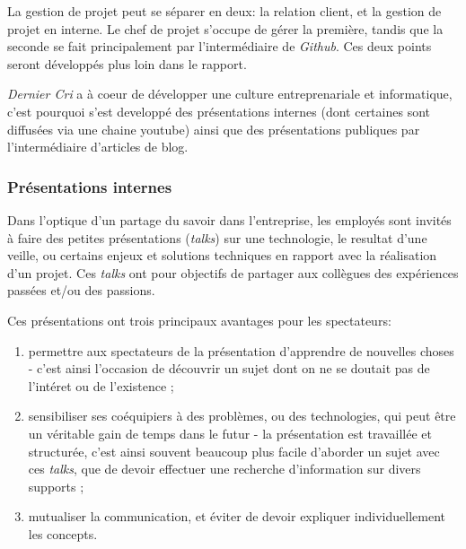 \bigskip

La gestion de projet peut se séparer en deux: la relation client, et la
gestion de projet en interne. Le chef de projet s'occupe de gérer la
première, tandis que la seconde se fait principalement par
l'intermédiaire de \emph{Github}. Ces deux points seront développés plus
loin dans le rapport.

\bigskip

\emph{Dernier Cri} a à coeur de développer une culture entreprenariale
et informatique, c'est pourquoi s'est developpé des présentations
internes (dont certaines sont diffusées via une chaine youtube) ainsi
que des présentations publiques par l'intermédiaire d'articles de blog.

\subsubsection{Présentations internes}\label{pruxe9sentations-internes}

\bigskip

Dans l'optique d'un partage du savoir dans l'entreprise, les employés
sont invités à faire des petites présentations (\emph{talks}) sur une
technologie, le resultat d'une veille, ou certains enjeux et solutions
techniques en rapport avec la réalisation d'un projet. Ces \emph{talks}
ont pour objectifs de partager aux collègues des expériences passées
et/ou des passions.

\bigskip

Ces présentations ont trois principaux avantages pour les spectateurs:

\begin{enumerate}
\def\labelenumi{\arabic{enumi}.}
\tightlist
\item
  permettre aux spectateurs de la présentation d'apprendre de nouvelles
  choses - c'est ainsi l'occasion de découvrir un sujet dont on ne se
  doutait pas de l'intéret ou de l'existence ;\\
\item
  sensibiliser ses coéquipiers à des problèmes, ou des technologies, qui
  peut être un véritable gain de temps dans le futur - la présentation
  est travaillée et structurée, c'est ainsi souvent beaucoup plus facile
  d'aborder un sujet avec ces \emph{talks}, que de devoir effectuer une
  recherche d'information sur divers supports ;\\
\item
  mutualiser la communication, et éviter de devoir expliquer
  individuellement les concepts.
\end{enumerate}

